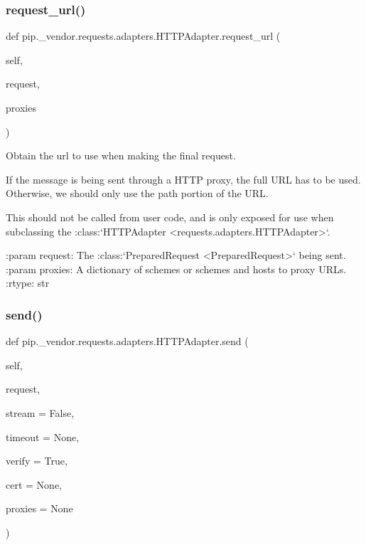 \subsubsection{\texorpdfstring{request\+\_\+url()}{request\_url()}}
{\footnotesize\ttfamily def pip.\+\_\+vendor.\+requests.\+adapters.\+H\+T\+T\+P\+Adapter.\+request\+\_\+url (\begin{DoxyParamCaption}\item[{}]{self,  }\item[{}]{request,  }\item[{}]{proxies }\end{DoxyParamCaption})}

\begin{DoxyVerb}Obtain the url to use when making the final request.

If the message is being sent through a HTTP proxy, the full URL has to
be used. Otherwise, we should only use the path portion of the URL.

This should not be called from user code, and is only exposed for use
when subclassing the
:class:`HTTPAdapter <requests.adapters.HTTPAdapter>`.

:param request: The :class:`PreparedRequest <PreparedRequest>` being sent.
:param proxies: A dictionary of schemes or schemes and hosts to proxy URLs.
:rtype: str
\end{DoxyVerb}
 \mbox{\label{classpip_1_1__vendor_1_1requests_1_1adapters_1_1HTTPAdapter_a6b8cb9b4129cbc1c9aa685dc69f869a4}} 
\subsubsection{\texorpdfstring{send()}{send()}}
{\footnotesize\ttfamily def pip.\+\_\+vendor.\+requests.\+adapters.\+H\+T\+T\+P\+Adapter.\+send (\begin{DoxyParamCaption}\item[{}]{self,  }\item[{}]{request,  }\item[{}]{stream = {\ttfamily False},  }\item[{}]{timeout = {\ttfamily None},  }\item[{}]{verify = {\ttfamily True},  }\item[{}]{cert = {\ttfamily None},  }\item[{}]{proxies = {\ttfamily None} }\end{DoxyParamCaption})}

